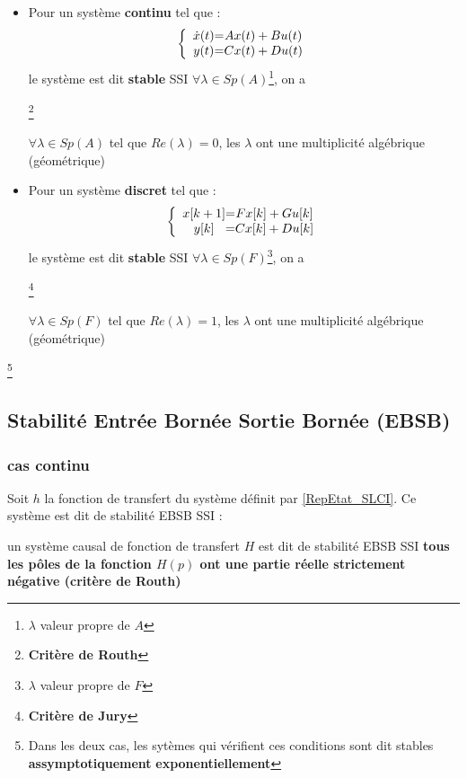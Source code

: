 \begin{itemize}
    \item Pour un système \textbf{continu} tel que :
    \Large{
        \[
    \left \{
    \begin{array}{c @{=} c}
        \dot x(t) & Ax(t) + Bu(t)\\
        y(t) & Cx(t) + Du(t)
    \end{array}
    \right.
    \]
    }
    \Large{le système est dit \textbf{stable} SSI $\forall \lambda \in Sp(A)$\footnote{$\lambda$ valeur propre de $A$}, on a} \newline
    \begin{center}
        \Large{}\footnote{\textbf{\textcolor{BrickRed}{Critère de Routh}}} \newline
    \end{center}
    \large{$\forall \lambda \in Sp(A)$ tel que $Re(\lambda) = 0$, les $\lambda$ ont une multiplicité algébrique (géométrique)}

    \item \Large{Pour un système \textbf{discret} tel que :}
    \Large{
        \[
    \left \{
    \begin{array}{c @{=} c}
        x[k+1] & Fx[k] + Gu[k]\\
        y[k] & Cx[k] + Du[k]
    \end{array}
    \right.
    \]
    }
    \Large{le système est dit \textbf{stable} SSI $\forall \lambda \in Sp(F)$\footnote{$\lambda$ valeur propre de $F$}, on a} \newline
    \begin{center}
        \Large{}\footnote{\textbf{\textcolor{BrickRed}{Critère de Jury}}} \newline
    \end{center} 
    \large{$\forall \lambda \in Sp(F)$ tel que $Re(\lambda) = 1$, les $\lambda$ ont une multiplicité algébrique (géométrique)}    
\end{itemize}
\footnote{Dans les deux cas, les sytèmes qui vérifient ces conditions sont dit stables \textbf{assymptotiquement} \textbf{exponentiellement}}
\newpage
\subsection{Stabilité Entrée Bornée Sortie Bornée (EBSB)}
\subsubsection{\Large{cas continu}}
Soit $h$ la fonction de transfert du système définit par \eqref{RepEtat_SLCI}. Ce système est dit de stabilité EBSB SSI : \newline
\begin{center}
    \Large{}
\end{center}
un système causal de fonction de transfert $H$ est dit de stabilité EBSB SSI \textbf{tous les pôles de la fonction $H(p)$ ont une partie réelle strictement négative (critère de Routh)}
